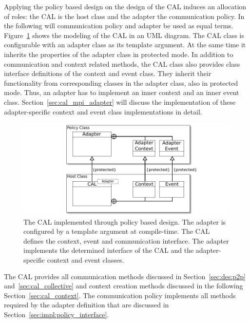 Applying the policy based design on the design of the CAL induces an
allocation of roles: the CAL is the host class and the adapter the
communication policy. In the following will communication policy and
adapter be used as equal terms.  Figure~\ref{fig:cal_uml} shows the
modeling of the CAL in an UML diagram.  The CAL class is configurable
with an adapter class as its template argument. At the same time it
inherits the properties of the adapter class in protected mode.  In
addition to communication and context related methods, the CAL class
also provides class interface definitions of the context and event
class. They inherit their functionality from corresponding classes in the
adapter class, also in protected mode. Thus, an adapter has to
implement an inner context and an inner event class.
Section~\ref{sec:cal_mpi_adapter} will discuss the implementation of
these adapter-specific context and event class implementations in
detail.

\begin{figure}[H]
  \centering \includegraphics[width=\textwidth]{graphics/40_cal_uml}
  \caption{The CAL implemented through policy based design. The adapter is
    configured by a template argument at compile-time. The CAL defines
    the context, event and communication interface. The adapter
    implements the determined interface of the CAL and the adapter-specific
    context and event classes.}
  \label{fig:cal_uml}
\end{figure}

\noindent The CAL provides all communication methods discussed in
Section~\ref{sec:des:p2p} and~\ref{sec:cal_collective} and context
creation methods discussed in the following
Section~\ref{sec:cal_context}. The communication policy implements all
methods required by the adapter definition that are discussed in
Section~\ref{sec:impl:policy_interface}.



